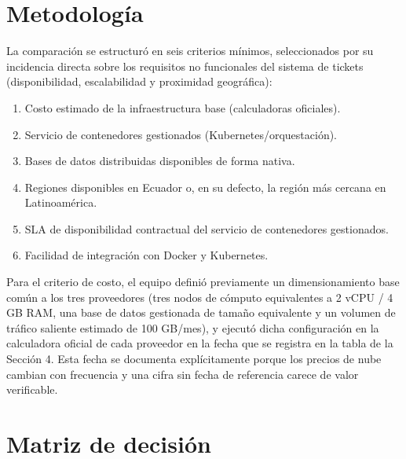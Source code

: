 \documentclass[12pt, a4paper]{article}
\begin{document}
\section{Metodología}

La comparación se estructuró en seis criterios mínimos, seleccionados por su incidencia directa sobre los requisitos no funcionales del sistema de tickets (disponibilidad, escalabilidad y proximidad geográfica):

\begin{enumerate}
    \item Costo estimado de la infraestructura base (calculadoras oficiales).
    \item Servicio de contenedores gestionados (Kubernetes/orquestación).
    \item Bases de datos distribuidas disponibles de forma nativa.
    \item Regiones disponibles en Ecuador o, en su defecto, la región más cercana en Latinoamérica.
    \item SLA de disponibilidad contractual del servicio de contenedores gestionados.
    \item Facilidad de integración con Docker y Kubernetes.
\end{enumerate}

Para el criterio de costo, el equipo definió previamente un dimensionamiento base común a los tres proveedores (tres nodos de cómputo equivalentes a 2 vCPU / 4 GB RAM, una base de datos gestionada de tamaño equivalente y un volumen de tráfico saliente estimado de 100 GB/mes), y ejecutó dicha configuración en la calculadora oficial de cada proveedor en la fecha que se registra en la tabla de la Sección 4. Esta fecha se documenta explícitamente porque los precios de nube cambian con frecuencia y una cifra sin fecha de referencia carece de valor verificable.

\section{Matriz de decisión}
\end{document}
